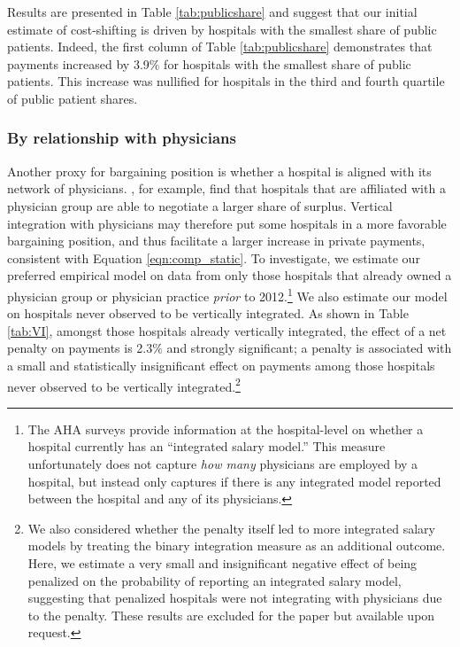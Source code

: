 \documentclass[12pt]{article}
\begin{document}
Results are presented in Table \ref{tab:publicshare} and suggest that our initial estimate of cost-shifting is driven by hospitals with the smallest share of public patients. Indeed, the first column of Table \ref{tab:publicshare} demonstrates that payments increased by 3.9\% for hospitals with the smallest share of public patients. This increase was nullified for hospitals in the third and fourth quartile of public patient shares.


\subsubsection*{By relationship with physicians}
Another proxy for bargaining position is whether a hospital is aligned with its network of physicians. \cite{lewis2015}, for example, find that hospitals that are affiliated with a physician group are able to negotiate a larger share of surplus. Vertical integration with physicians may therefore put some hospitals in a more favorable bargaining position, and thus facilitate a larger increase in private payments, consistent with Equation \ref{eqn:comp_static}. To investigate, we estimate our preferred empirical model on data from only those hospitals that already owned a physician group or physician practice \textit{prior} to 2012.\footnote{The AHA surveys provide information at the hospital-level on whether a hospital currently has an ``integrated salary model.'' This measure unfortunately does not capture \textit{how many} physicians are employed by a hospital, but instead only captures if there is any integrated model reported between the hospital and any of its physicians.} We also estimate our model on hospitals never observed to be vertically integrated.  As shown in Table \ref{tab:VI}, amongst those hospitals already vertically integrated, the effect of a net penalty on payments is 2.3$\%$ and strongly significant; a penalty is associated with a small and statistically insignificant effect on payments among those hospitals never observed to be vertically integrated.\footnote{We also considered whether the penalty itself led to more integrated salary models by treating the binary integration measure as an additional outcome. Here, we estimate a very small and insignificant negative effect of being penalized on the probability of reporting an integrated salary model, suggesting that penalized hospitals were not integrating with physicians due to the penalty. These results are excluded for the paper but available upon request.}
\end{document}
